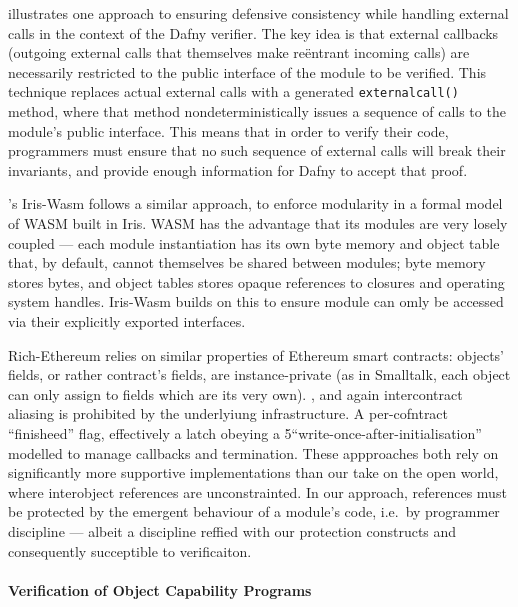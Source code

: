 \citet{CassezFQ24} illustrates one approach to ensuring defensive
consistency while handling external calls in the context of the Dafny
verifier. The key idea is that external callbacks (outgoing external
calls that themselves make re{\"e}ntrant incoming calls) are
necessarily restricted to the public interface of the module to be
verified.  This technique replaces actual external calls with a
generated \texttt{externalcall()} method, where that method
nondeterministically issues a sequence of calls to the module's public
interface.  This means that in order to verify their code, programmers
must ensure that no such sequence of external calls will break their
invariants, and provide enough information for Dafny to accept that
proof.

\citet{itis-wasm-pldi2023}'s Iris-Wasm follows a similar approach,
to enforce 
modularity in a formal model of WASM built in Iris.  WASM has the
advantage that its modules are very losely coupled --- each module
instantiation has its own byte memory and object table that, by default,
cannot themselves be shared between modules; byte memory stores bytes,
and object tables stores opaque references to closures and operating
system handles. Iris-Wasm builds on this to ensure module can omly be
accessed via their explicitly exported interfaces.

Rich-Ethereum \cite{rich-specs-smart-contracts-oopsla2021} relies on similar
properties of Ethereum smart contracts: objects' fields,
or rather contract's fields, 
are instance-private (as in Smalltalk, each object can only
assign to fields which are its very own).  , and again intercontract aliasing is prohibited
by the underlyiung infrastructure.  A per-cofntract ``finisheed''
flag, effectively a latch obeying a
5``write-once-after-initialisation'' modelled to manage callbacks and
termination.  These appproaches both rely on significantly more
supportive implementations than our take on the open world, where
interobject references are unconstrainted.
In our approach, references must be protected by the emergent
behaviour of a module's code, i.e.\  by programmer discipline ---
albeit a discipline reffied with our protection constructs and
consequently succeptible to verificaiton.






\paragraph{Verification of Object Capability Programs}



